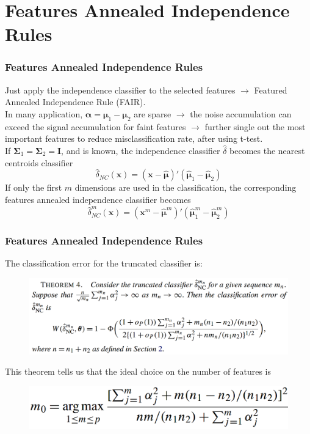 \documentclass{beamer}
\begin{document}
	\section{Features Annealed Independence Rules}
	\begin{frame}
		\frametitle{Features Annealed Independence Rules}
		Just apply the independence classifier to the selected features $\rightarrow$ Featured Annealed Independence Rule (FAIR).\\
		\vspace{\baselineskip}
		In many application, $\bm{\alpha} = \bm{\mu}_1 - \bm{\mu}_2$ are sparse $\rightarrow$ the noise accumulation can exceed the signal accumulation for faint features $\rightarrow$ further single out the most important features to reduce misclassification rate, after using t-test.\\
		\vspace{\baselineskip}
		If $\bm{\Sigma}_1 = \bm{\Sigma}_2 = \bm{I}$, and is known, the independence classifier $\hat{\delta}$ becomes the nearest centroids classifier
		$$\hat{\delta}_{NC}(\bm{x}) = (\bm{x} - \hat{\bm{\mu}})'(\hat{\bm{\mu}}_1 - \hat{\bm{\mu}}_2)$$
		If only the first $m$ dimensions are used in the classification, the corresponding features annealed independence classifier becomes
		$$\hat{\delta}^m_{NC}(\bm{x}) = (\bm{x}^m - \hat{\bm{\mu}}^m)'(\hat{\bm{\mu}}_1^m - \hat{\bm{\mu}}_2^m)$$
	\end{frame}
	
	
	\begin{frame}
		\frametitle{Features Annealed Independence Rules}
		The classification error for the truncated classifier is: 
		\begin{figure}
			\includegraphics[width=1\linewidth]{image007.png}
		\end{figure}
		This theorem tells us that the ideal choice on the number of features is
		\begin{figure}
			\includegraphics[width=.7\linewidth]{image008.png}
		\end{figure} 
	\end{frame}
	
\end{document}
